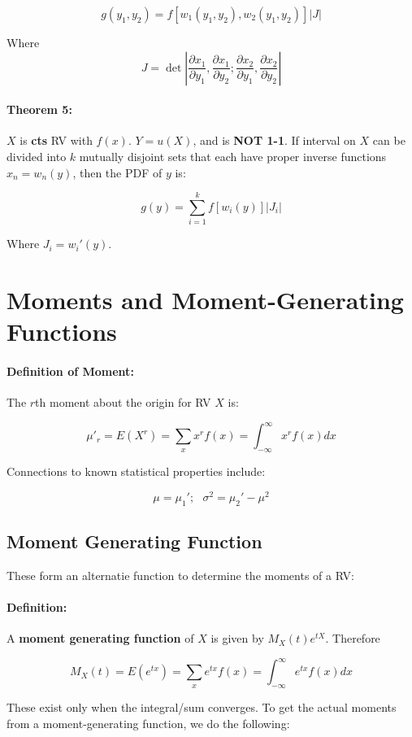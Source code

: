 \documentclass[a4paper,12pt]{report}
\begin{document}
$$g(y_1, y_2) = f[w_1(y_1, y_2), w_2(y_1, y_2)]|J|$$ 

Where $$J = \det{|\frac{\partial x_1}{\partial y_1} , \frac{\partial x_1}{\partial y_2} ; \frac{\partial x_2}{\partial y_1} , \frac{\partial x_2}{\partial y_2} |}$$

\paragraph{Theorem 5: } $X$ is \textbf{cts} RV with $f(x)$. $Y = u(X)$, and is \textbf{NOT 1-1}. If interval on $X$ can be divided into $k$ mutually disjoint sets that each have proper inverse functions 
$x_n = w_n(y)$, then the PDF of $y$ is: 

$$g(y) = \sum_{i = 1}^{k} f[w_i(y)]|J_i|$$

Where $J_i = w_i'(y)$.

\section{Moments and Moment-Generating Functions}

\paragraph{Definition of Moment: } The $r$th moment about the origin for RV $X$ is: 

$$\mu'_r = E(X^r) = \sum_x x^r f(x) = \int_{-\infty}^{\infty} x^r f(x) dx$$

Connections to known statistical properties include:

$$\mu = \mu_1';\,\,\,\, \sigma^2 = \mu_2' - \mu^2$$

\subsection{Moment Generating Function}

These form an alternatie function to determine the moments of a RV:

\paragraph{Definition: } A \textbf{moment generating function} of $X$ is given by $M_X(t)e^{tX}$. Therefore

$$M_X(t) = E(e^{tx}) = \sum_x e^{tx}f(x) = \int_{-\infty}^{\infty} e^{tx}f(x) dx$$

These exist only when the integral/sum converges. To get the actual moments from a moment-generating function, we do the following: 
\end{document}
